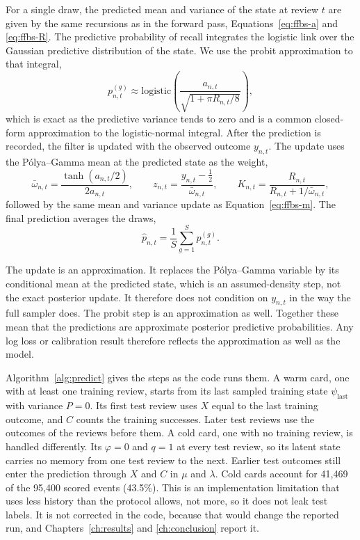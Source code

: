 For a single draw, the predicted mean and variance of the state at review $t$ are given by the same
recursions as in the forward pass, Equations~\eqref{eq:ffbs-a} and \eqref{eq:ffbs-R}. The predictive
probability of recall integrates the logistic link over the Gaussian predictive distribution of the
state. We use the probit approximation to that integral,
\begin{equation}\label{eq:probit}
  p^{(g)}_{n,t} \approx \mathrm{logistic}\!\left(\frac{a_{n,t}}{\sqrt{1+\pi R_{n,t}/8}}\right),
\end{equation}
which is exact as the predictive variance tends to zero and is a common closed-form approximation to the logistic-normal integral. After the prediction is recorded, the filter is updated with the observed outcome $y_{n,t}$. The update uses the P\'olya--Gamma
mean at the predicted state as the weight,
\begin{equation}\label{eq:pred-update}
  \bar\omega_{n,t} = \frac{\tanh(a_{n,t}/2)}{2a_{n,t}}, \qquad
  z_{n,t} = \frac{y_{n,t} - \tfrac{1}{2}}{\bar\omega_{n,t}}, \qquad
  K_{n,t} = \frac{R_{n,t}}{R_{n,t} + 1/\bar\omega_{n,t}},
\end{equation}
followed by the same mean and variance update as Equation~\eqref{eq:ffbs-m}. The final prediction
averages the draws,
\begin{equation}\label{eq:pred-avg}
  \hat p_{n,t} = \frac{1}{S}\sum_{g=1}^{S} p^{(g)}_{n,t}.
\end{equation}

The update is an approximation. It replaces the P\'olya--Gamma variable by its conditional mean at the
predicted state, which is an assumed-density step, not the exact posterior update. It therefore does
not condition on $y_{n,t}$ in the way the full sampler does. The probit step is an approximation as
well. Together these mean that the predictions are approximate posterior predictive probabilities. Any log loss or calibration result therefore reflects the approximation as well as the model.

Algorithm~\ref{alg:predict} gives the steps as the code runs them. A warm card, one with at least one training review, starts from its last sampled training state $\psi_{\mathrm{last}}$ with variance $P = 0$. Its first test review uses $X$ equal to the last training outcome, and $C$ counts the training successes. Later test reviews use the outcomes of the reviews before them. A cold card, one with no training review, is handled differently. Its $\varphi = 0$ and $q = 1$ at every test review, so its latent state carries no memory from one test review to the next. Earlier test outcomes still enter the prediction through $X$ and $C$ in $\mu$ and $\lambda$. Cold cards account for 41,469 of the 95,400 scored events (43.5\%). This is an implementation limitation that uses less history than the protocol allows, not more, so it does not leak test labels. It is not corrected in the code, because that would change the reported run, and Chapters~\ref{ch:results} and \ref{ch:conclusion} report it.


